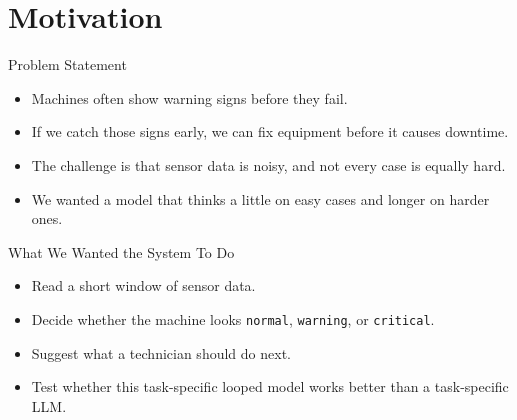 \section{Motivation}

\begin{frame}{Problem Statement}
  \begin{itemize}
    \item Machines often show warning signs before they fail.
    \item If we catch those signs early, we can fix equipment before it causes downtime.
    \item The challenge is that sensor data is noisy, and not every case is equally hard.
    \item We wanted a model that thinks a little on easy cases and longer on harder ones.
  \end{itemize}
\end{frame}

\begin{frame}{What We Wanted the System To Do}
  \begin{itemize}
    \item Read a short window of sensor data.
    \item Decide whether the machine looks \texttt{normal}, \texttt{warning}, or \texttt{critical}.
    \item Suggest what a technician should do next.
    \item Test whether this task-specific looped model works better than a task-specific LLM.
  \end{itemize}
\end{frame}
